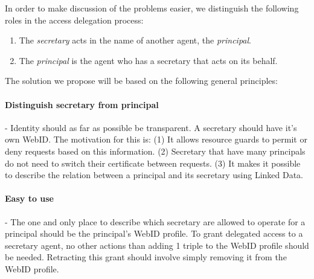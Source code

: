 \documentclass[a4paper]{llncs}
\begin{document}



In order to make discussion of the problems easier, we distinguish the following roles in the access delegation process:
\begin{enumerate}
    \item The \textit{secretary} acts in the name of another agent, the \textit{principal}.
    \item The \textit{principal} is the agent who has a secretary that acts on its behalf.
\end{enumerate}
The solution we propose will be based on the following general principles:

\paragraph{Distinguish secretary from principal }-
Identity should as far as possible be transparent.
A secretary should have it's own WebID.
The motivation for this is:
(1) It allows resource guards to permit or deny requests based on this information.
(2) Secretary that have many principals do not need to switch their certificate between requests.
(3) It makes it possible to describe the relation between a principal and its secretary using Linked Data.

\paragraph{Easy to use}-
The one and only place to describe which secretary are allowed to operate for a principal should be the principal's WebID profile.
To grant delegated access to a secretary agent, no other actions than adding 1 triple to the WebID profile should be needed.
Retracting this grant should involve simply removing it from the WebID profile.

\end{document}
